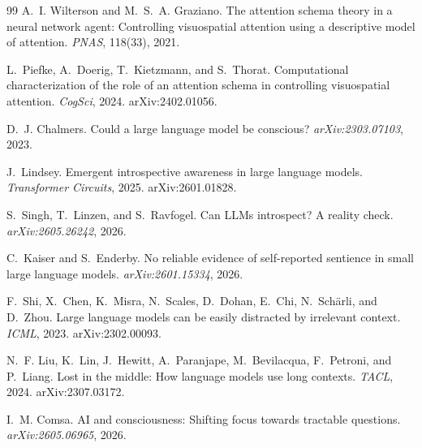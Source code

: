 \documentclass[11pt]{article}
\begin{document}
\begin{thebibliography}{99}
 A.~I. Wilterson and M.~S.~A. Graziano. The attention
schema theory in a neural network agent: Controlling visuospatial attention
using a descriptive model of attention. \emph{PNAS}, 118(33), 2021.

 L.~Piefke, A.~Doerig, T.~Kietzmann, and S.~Thorat.
Computational characterization of the role of an attention schema in
controlling visuospatial attention. \emph{CogSci}, 2024. arXiv:2402.01056.

 D.~J. Chalmers. Could a large language model be
conscious? \emph{arXiv:2303.07103}, 2023.

 J.~Lindsey. Emergent introspective awareness in large
language models. \emph{Transformer Circuits}, 2025. arXiv:2601.01828.

 S.~Singh, T.~Linzen, and S.~Ravfogel. Can LLMs introspect?
A reality check. \emph{arXiv:2605.26242}, 2026.

 C.~Kaiser and S.~Enderby. No reliable evidence of
self-reported sentience in small large language models.
\emph{arXiv:2601.15334}, 2026.

 F.~Shi, X.~Chen, K.~Misra, N.~Scales, D.~Dohan, E.~Chi,
N.~Sch\"arli, and D.~Zhou. Large language models can be easily distracted by
irrelevant context. \emph{ICML}, 2023. arXiv:2302.00093.

 N.~F. Liu, K.~Lin, J.~Hewitt, A.~Paranjape, M.~Bevilacqua,
F.~Petroni, and P.~Liang. Lost in the middle: How language models use long
contexts. \emph{TACL}, 2024. arXiv:2307.03172.

 I.~M. Comsa. AI and consciousness: Shifting focus towards
tractable questions. \emph{arXiv:2605.06965}, 2026.

\end{thebibliography}
\end{document}
